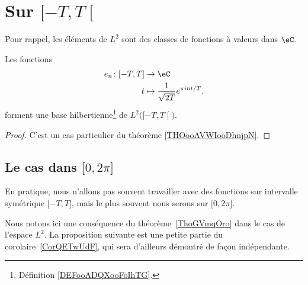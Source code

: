 
\section{Sur \( \mathopen\lbrack -T , T \mathclose\lbrack\)}

Pour rappel, les éléments de \( L^2\) sont des classes de fonctions à valeurs dans \( \eC\).

\begin{proposition}     \label{PROPooHNJZooGfRCfU}
	Les fonctions
	\begin{equation}
		\begin{aligned}
			e_n\colon \mathopen[ -T , T \mathclose] & \to \eC                                        \\
			t                                       & \mapsto \frac{1}{ \sqrt{ 2T } } e^{\pi int/T}.
		\end{aligned}
	\end{equation}
	forment une base hilbertienne\footnote{Définition \ref{DEFooADQXooFoIhTG}.} de \( L^2\big( \mathopen[ -T , T \mathclose[ \big)\).
\end{proposition}

\begin{proof}
	C'est un cas particulier du théorème \ref{THOooAVWIooDhnjpN}.
\end{proof}

\subsection{Le cas dans \( \mathopen[ 0 , 2\pi \mathclose]\)}

En pratique, nous n'allons pas souvent travailler avec des fonctions sur intervalle symétrique \( \mathopen[ -T , T \mathclose]\), mais le plus souvent nous serons sur \( \mathopen[ 0 , 2\pi \mathclose]\).

Nous notons ici une conséquence du théorème~\ref{ThoGVmqOro} dans le cas de l'espace \( L^2\). La proposition suivante est une petite partie du corolaire~\ref{CorQETwUdF}, qui sera d'ailleurs démontré de façon indépendante.

